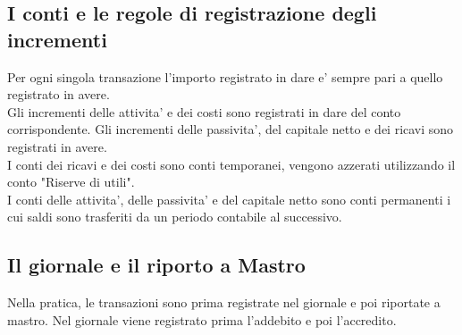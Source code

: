 \documentclass{report}
\begin{document}
	\subsection{I conti e le regole di registrazione degli incrementi}
	Per ogni singola transazione l'importo registrato in dare e' sempre pari a quello registrato in avere. \medskip \\Gli incrementi delle attivita' e dei costi sono registrati in dare del conto corrispondente. Gli incrementi delle passivita', del capitale netto e dei ricavi sono registrati in avere. \medskip \\I conti dei ricavi e dei costi sono conti temporanei, vengono azzerati utilizzando il conto "Riserve di utili".\medskip \\I conti delle attivita', delle passivita' e del capitale netto sono conti permanenti i cui saldi sono trasferiti da un periodo contabile al successivo.
	\subsection{Il giornale e il riporto a Mastro}
	Nella pratica, le transazioni sono prima registrate nel giornale e poi riportate a mastro. Nel giornale viene registrato prima l'addebito e poi l'accredito.
	
\end{document}
